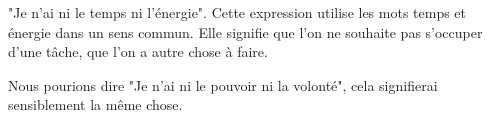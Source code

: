 "Je n'ai ni le temps ni l'énergie". Cette expression utilise les mots temps et énergie dans un sens commun. Elle signifie que l'on ne souhaite pas s'occuper d'une tâche, que l'on a autre chose à faire.

Nous pourions dire "Je n'ai ni le pouvoir ni la volonté", cela signifierai sensiblement la même chose.
